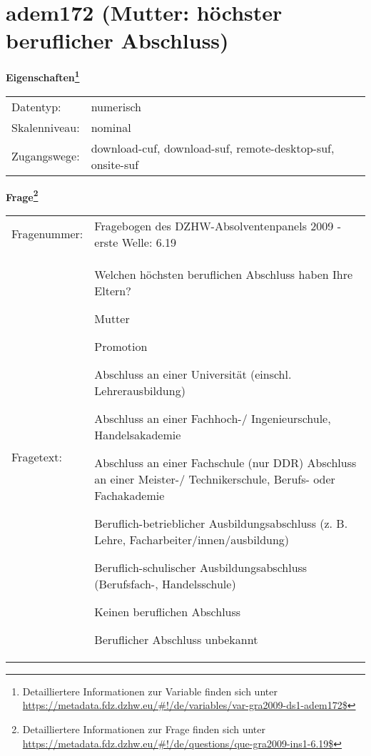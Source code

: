 
    \setcounter{footnote}{0}

    \vspace*{-1.8cm}
	\section{adem172 (Mutter: höchster beruflicher Abschluss)}
	\label{section:adem172}



    \vspace*{0.5cm}
    \noindent\textbf{Eigenschaften\footnote{Detailliertere Informationen zur Variable finden sich unter
		\url{https://metadata.fdz.dzhw.eu/\#!/de/variables/var-gra2009-ds1-adem172$}}}\\
	\begin{tabularx}{\hsize}{@{}lX}
	Datentyp: & numerisch \\
	Skalenniveau: & nominal \\
	Zugangswege: &
	  download-cuf, 
	  download-suf, 
	  remote-desktop-suf, 
	  onsite-suf
 \\
    \end{tabularx}



				\vspace*{0.5cm}
                \noindent\textbf{Frage\footnote{Detailliertere Informationen zur Frage finden sich unter
		              \url{https://metadata.fdz.dzhw.eu/\#!/de/questions/que-gra2009-ins1-6.19$}}}\\
				\begin{tabularx}{\hsize}{@{}lX}
					Fragenummer: &
					  Fragebogen des DZHW-Absolventenpanels 2009 - erste Welle:
					  6.19
 \\
					Fragetext: & Welchen höchsten beruflichen Abschluss haben Ihre Eltern?\par  Mutter\par  Promotion\par  Abschluss an einer Universität (einschl. Lehrerausbildung)\par  Abschluss an einer Fachhoch-/ Ingenieurschule, Handelsakademie\par  Abschluss an einer Fachschule (nur DDR) Abschluss an einer Meister-/ Technikerschule, Berufs- oder Fachakademie\par  Beruflich-betrieblicher Ausbildungsabschluss (z. B. Lehre, Facharbeiter/innen/ausbildung)\par  Beruflich-schulischer Ausbildungsabschluss (Berufsfach-, Handelsschule)\par  Keinen beruflichen Abschluss\par  Beruflicher Abschluss unbekannt \\
				\end{tabularx}





